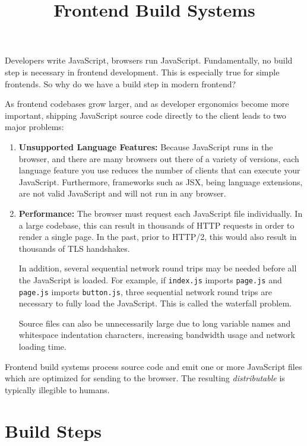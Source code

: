 \documentclass{article}
\title{Frontend Build Systems}
\begin{document}
\maketitle
\tableofcontents

Developers write JavaScript, browsers run JavaScript. Fundamentally, no build step is necessary in
frontend development. This is especially true for simple frontends. So why do we have a build step
in modern frontend?

As frontend codebases grow larger, and as developer ergonomics become more important, shipping
JavaScript source code directly to the client leads to two major problems:

\begin{enumerate}
  \item \textbf{Unsupported Language Features:} Because JavaScript runs in the browser, and there
    are many browsers out there of a variety of versions, each language feature you use reduces the
    number of clients that can execute your JavaScript. Furthermore, frameworks such as JSX, being
    language extensions, are not valid JavaScript and will not run in any browser.

  \item \textbf{Performance:} The browser must request each JavaScript file individually. In a large
    codebase, this can result in thousands of HTTP requests in order to render a single page. In the
    past, prior to HTTP/2, this would also result in thousands of TLS handshakes.

    In addition, several sequential network round trips may be needed before all the JavaScript is
    loaded. For example, if \texttt{index.js} imports \texttt{page.js} and \texttt{page.js} imports
    \texttt{button.js}, three sequential network round trips are necessary to fully load the
    JavaScript. This is called the waterfall problem.

    Source files can also be unnecessarily large due to long variable names and whitespace
    indentation characters, increasing bandwidth usage and network loading time.
\end{enumerate}

Frontend build systems process source code and emit one or more JavaScript files which are optimized
for sending to the browser. The resulting \textit{distributable} is typically illegible to humans.

\section{Build Steps}
\end{document}
